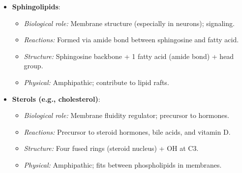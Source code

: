 \documentclass[letterpaper, 12pt]{article}
\begin{document}
\begin{itemize}
\begin{itemize}
    \item \textbf{Sphingolipids}:
    \begin{itemize}
        \item \textit{Biological role:} Membrane structure (especially in neurons); signaling.
        \item \textit{Reactions:} Formed via amide bond between sphingosine and fatty acid.
        \item \textit{Structure:} Sphingosine backbone + 1 fatty acid (amide bond) + head group.
        \item \textit{Physical:} Amphipathic; contribute to lipid rafts.
    \end{itemize}

    \item \textbf{Sterols (e.g., cholesterol)}:
    \begin{itemize}
        \item \textit{Biological role:} Membrane fluidity regulator; precursor to hormones.
        \item \textit{Reactions:} Precursor to steroid hormones, bile acids, and vitamin D.
        \item \textit{Structure:} Four fused rings (steroid nucleus) + OH at C3.
        \item \textit{Physical:} Amphipathic; fits between phospholipids in membranes.
    \end{itemize}


\end{itemize}
\end{itemize}
\end{document}

